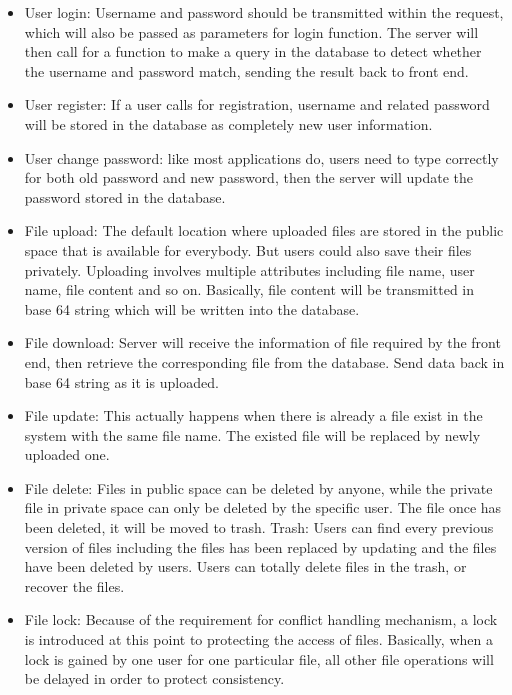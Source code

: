 \documentclass[a4paper,11pt]{article}
\begin{document}
\begin{itemize}
\item User login: Username and password should be transmitted within the request, which will also be passed as parameters for login function. The server will then call for a function to make a query in the database to detect whether the username and password match, sending the result back to front end.

\item User register: If a user calls for registration, username and related password will be stored in the database as completely new user information.

\item User change password: like most applications do, users need to type correctly for both old password and new password, then the server will update the password stored in the database.

\item File upload: The default location where uploaded files are stored in the public space that is available for everybody. But users could also save their files privately. Uploading involves multiple attributes including file name, user name, file content and so on. Basically, file content will be transmitted in base 64 string which will be written into the database.

\item File download: Server will receive the information of file required by the front end, then retrieve the corresponding file from the database. Send data back in base 64 string as it is uploaded. 

\item File update: This actually happens when there is already a file exist in the system with the same file name. The existed file will be replaced by newly uploaded one.

\item File delete: Files in public space can be deleted by anyone, while the private file in private space can only be deleted by the specific user. The file once has been deleted, it will be moved to trash.
Trash: Users can find every previous version of files including the files has been replaced by updating and the files have been deleted by users. Users can totally delete files in the trash, or recover the files.

\item File lock: Because of the requirement for conflict handling mechanism, a lock is introduced at this point to protecting the access of files. Basically, when a lock is gained by one user for one particular file, all other file operations will be delayed in order to protect consistency.
\end{itemize}
\end{document}
